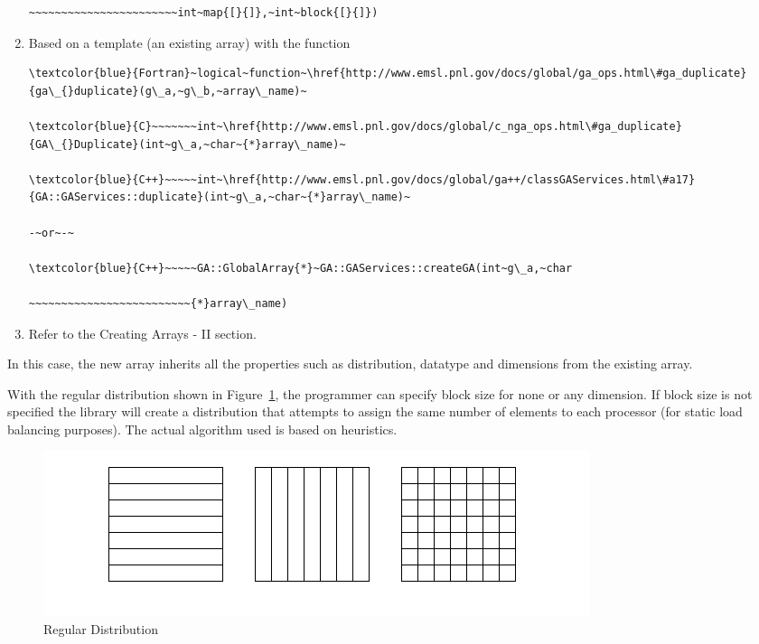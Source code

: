 \begin{enumerate}
\begin{verbatim}
~~~~~~~~~~~~~~~~~~~~~~~int~map{[}{]},~int~block{[}{]})
\end{verbatim}
\item Based on a template (an existing array) with the function

\begin{verbatim}
\textcolor{blue}{Fortran}~logical~function~\href{http://www.emsl.pnl.gov/docs/global/ga_ops.html\#ga_duplicate}{ga\_{}duplicate}(g\_a,~g\_b,~array\_name)~

\textcolor{blue}{C}~~~~~~~int~\href{http://www.emsl.pnl.gov/docs/global/c_nga_ops.html\#ga_duplicate}{GA\_{}Duplicate}(int~g\_a,~char~{*}array\_name)~

\textcolor{blue}{C++}~~~~~int~\href{http://www.emsl.pnl.gov/docs/global/ga++/classGAServices.html\#a17}{GA::GAServices::duplicate}(int~g\_a,~char~{*}array\_name)~

-~or~-~

\textcolor{blue}{C++}~~~~~GA::GlobalArray{*}~GA::GAServices::createGA(int~g\_a,~char

~~~~~~~~~~~~~~~~~~~~~~~~~{*}array\_name)
\end{verbatim}
\item Refer to the \textquotedbl{}Creating Arrays - II\textquotedbl{} section.
\end{enumerate}
In this case, the new array inherits all the properties such as distribution,
datatype and dimensions from the existing array.

With the regular distribution shown in Figure~\ref{cap:RegularDistribution},
the programmer can specify block size for none or any dimension. If
block size is not specified the library will create a distribution
that attempts to assign the same number of elements to each processor
(for static load balancing purposes). The actual algorithm used is
based on heuristics.

%
\begin{figure}
\begin{centering}
\includegraphics[width=0.9\columnwidth]{distr-1}
\par\end{centering}

\caption{\label{cap:RegularDistribution}Regular Distribution}

\end{figure}


